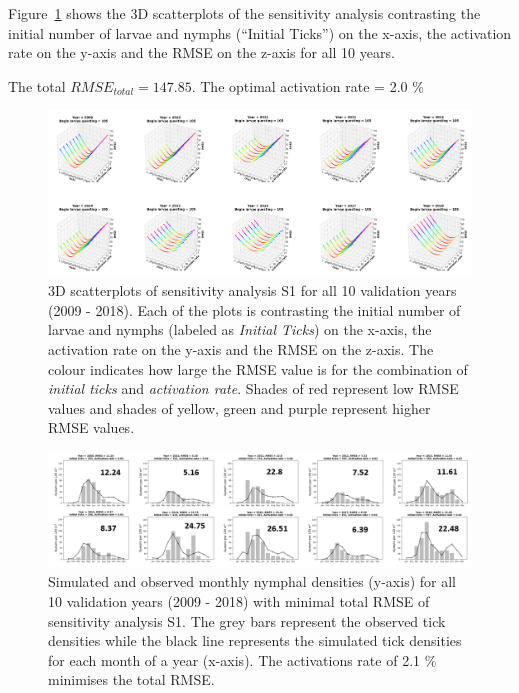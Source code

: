 \documentclass[a4paper, 11pt]{scrartcl}
\begin{document}
Figure~\ref{fig:initial_ticks_with_beech_error} shows the 3D scatterplots of the sensitivity analysis contrasting the initial number of larvae and nymphs (``Initial Ticks'') on
the x-axis, the activation rate on the y-axis and the RMSE on the z-axis for all 10 years.

The total $RMSE_{total} = 147.85$. The optimal activation rate = 2.0 \%


\begin{figure}[h!]
\centering
\includegraphics[width=\linewidth]{figures/initial_ticks_with_beech_error.png}
\caption{3D scatterplots of sensitivity analysis S1 for all 10 validation years (2009 - 2018). Each of the plots is contrasting the initial number of larvae and nymphs
(labeled as \textit{Initial Ticks}) on the x-axis, the activation rate on the y-axis and the RMSE on the z-axis. The colour indicates how large the RMSE value is for the
combination of \textit{initial ticks} and \textit{activation rate}. Shades of red represent low RMSE values and shades of yellow, green and purple represent higher RMSE values.}
\label{fig:initial_ticks_with_beech_error}
\end{figure}

\begin{figure}[h!]
\centering
\includegraphics[width=\linewidth]{figures/initial_ticks_with_beech.png}
\caption{Simulated and observed monthly nymphal densities (y-axis) for all 10 validation years (2009 - 2018) with minimal total RMSE of sensitivity analysis S1. The grey bars
represent the observed tick densities while the black line represents the simulated tick densities for each month of a year (x-axis). The activations rate of 2.1 \% minimises
the total RMSE.}
\label{fig:initial_ticks_with_beech}
\end{figure}
\end{document}
